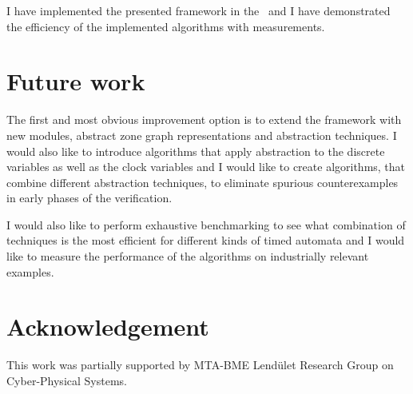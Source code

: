 I have implemented the presented framework in the \ttmcfw\ and I have demonstrated the efficiency of the implemented algorithms with measurements.

\section{Future work}

The first and most obvious improvement option is to extend the framework with new modules, abstract zone graph representations and abstraction techniques. I would also like to introduce algorithms that apply abstraction to the discrete variables as well as the clock variables and I would like to create algorithms, that combine different abstraction techniques, to eliminate spurious counterexamples in early phases of the verification.

I would also like to perform exhaustive benchmarking to see what combination of techniques is the most efficient for different kinds of timed automata and I would like to measure the performance of the algorithms on industrially relevant examples.

\section*{Acknowledgement} This work was partially supported by MTA-BME Lendület Research Group on Cyber-Physical Systems.